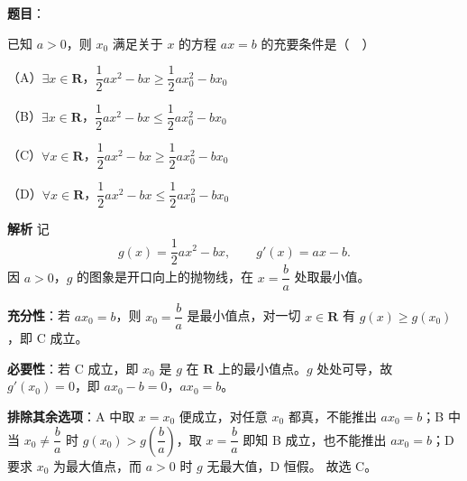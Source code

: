 \begin{answer}

\textbf{题目}：

已知 $a>0$，则 $x_0$ 满足关于 $x$ 的方程 $ax=b$ 的充要条件是（　）

（A）$\exists x\in\mathbf R$，$\dfrac12ax^2-bx\geqslant\dfrac12ax_0^2-bx_0$

（B）$\exists x\in\mathbf R$，$\dfrac12ax^2-bx\leqslant\dfrac12ax_0^2-bx_0$

（C）$\forall x\in\mathbf R$，$\dfrac12ax^2-bx\geqslant\dfrac12ax_0^2-bx_0$

（D）$\forall x\in\mathbf R$，$\dfrac12ax^2-bx\leqslant\dfrac12ax_0^2-bx_0$

\textbf{解析}
记
\nopagebreak[4]
\[g(x)=\frac12ax^2-bx,\qquad g'(x)=ax-b.\]
因 $a>0$，$g$ 的图象是开口向上的抛物线，在 $x=\dfrac ba$ 处取最小值。

\textbf{充分性}：若 $ax_0=b$，则 $x_0=\dfrac ba$ 是最小值点，对一切 $x\in\mathbf R$ 有 $g(x)\geqslant g(x_0)$，即 C 成立。

\textbf{必要性}：若 C 成立，即 $x_0$ 是 $g$ 在 $\mathbf R$ 上的最小值点。$g$ 处处可导，故 $g'(x_0)=0$，即 $ax_0-b=0$，$ax_0=b$。

\textbf{排除其余选项}：A 中取 $x=x_0$ 便成立，对任意 $x_0$ 都真，不能推出 $ax_0=b$；B 中当 $x_0\neq\dfrac ba$ 时 $g(x_0)>g\left(\dfrac ba\right)$，取 $x=\dfrac ba$ 即知 B 成立，也不能推出 $ax_0=b$；D 要求 $x_0$ 为最大值点，而 $a>0$ 时 $g$ 无最大值，D 恒假。
故选 C。


\end{answer}
